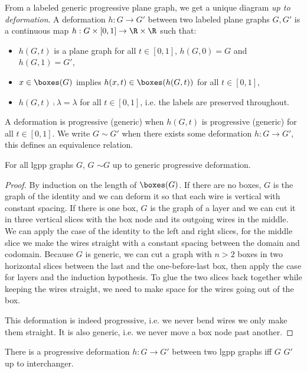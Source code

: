 From a labeled generic progressive plane graph, we get a unique diagram \emph{up to deformation}.
A deformation $h : G \to G'$ between two labeled plane graphs $G, G'$ is a continuous map $h : G \times [0, 1] \to \R \times \R$ such that:
\begin{itemize}
\item $h(G, t)$ is a plane graph for all $t \in [0, 1]$, $h(G, 0) = G$ and $h(G, 1) = G'$,
\item $x \in \boxes(G)$ implies $h(x, t) \in \boxes(h(G, t))$ for all $t \in [0, 1]$,
\item $h(G, t) \fcmp \lambda = \lambda$ for all $t \in [0, 1]$, i.e. the labels are preserved throughout.
\end{itemize}
A deformation is progressive (generic) when $h(G, t)$ is progressive (generic) for all $t \in [0, 1]$.
We write $G \sim G'$ when there exists some deformation $h : G \to G'$, this defines an equivalence relation.

\begin{theorem}\label{theorem:g2d then d2g}
For all lgpp graphs $G$,  $G$ \py{))} $\sim G$ up to generic progressive deformation.
\end{theorem}

\begin{proof}
By induction on the length of $\boxes(G)$.
If there are no boxes, $G$ is the graph of the identity and we can deform it so that each wire is vertical with constant spacing.
If there is one box, $G$ is the graph of a layer and we can cut it in three vertical slices with the box node and its outgoing wires in the middle.
We can apply the case of the identity to the left and right slices, for the middle slice we make the wires straight with a constant spacing between the domain and codomain.
Because $G$ is generic, we can cut a graph with $n > 2$ boxes in two horizontal slices between the last and the one-before-last box, then apply the case for layers and the induction hypothesis.
To glue the two slices back together while keeping the wires straight, we need to make space for the wires going out of the box.

This deformation is indeed progressive, i.e. we never bend wires we only make them straight.
It is also generic, i.e. we never move a box node past another.
\end{proof}

\begin{theorem}\label{theorem:d2g then g2d}
There is a progressive deformation $h : G \to G'$ between two lgpp graphs iff  $G$  $G'$ \py{)} up to interchanger.
\end{theorem}

